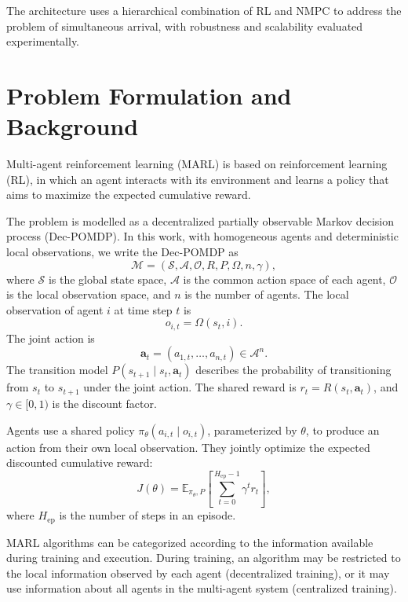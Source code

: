 \documentclass[11pt]{article}
\begin{document}
The architecture uses a hierarchical combination of RL and NMPC to address
the problem of simultaneous arrival, with robustness and scalability
evaluated experimentally.

\section{Problem Formulation and Background}
\label{sec:background}

Multi-agent reinforcement learning (MARL) is based on reinforcement learning
(RL), in which an agent interacts with its environment and learns a policy
that aims to maximize the expected cumulative reward.

The problem is modelled as a decentralized partially observable Markov
decision process (Dec-POMDP). In this work, with homogeneous agents and
deterministic local observations, we write the Dec-POMDP as
\begin{equation}
    \mathcal{M}
    = (\mathcal{S},\mathcal{A},\mathcal{O},R,P,\Omega,n,\gamma),
\end{equation}
where $\mathcal{S}$ is the global state space, $\mathcal{A}$ is the common
action space of each agent, $\mathcal{O}$ is the local observation space,
and $n$ is the number of agents. The local observation of agent $i$ at time
step $t$ is
\begin{equation}
    o_{i,t} = \Omega(s_t,i).
\end{equation}
The joint action is
\begin{equation}
    \mathbf{a}_t = (a_{1,t},\ldots,a_{n,t}) \in \mathcal{A}^{n}.
\end{equation}
The transition model $P(s_{t+1}\mid s_t,\mathbf{a}_t)$ describes the
probability of transitioning from $s_t$ to $s_{t+1}$ under the joint action.
The shared reward is $r_t=R(s_t,\mathbf{a}_t)$, and $\gamma\in[0,1)$ is
the discount factor.

Agents use a shared policy $\pi_\theta(a_{i,t}\mid o_{i,t})$, parameterized
by $\theta$, to produce an action from their own local observation. They
jointly optimize the expected discounted cumulative reward:
\begin{equation}
    J(\theta)
    = \mathbb{E}_{\pi_\theta,P}\!\left[
        \sum_{t=0}^{H_{\mathrm{ep}}-1}\gamma^t r_t
      \right],
    \label{eq:rl-objective}
\end{equation}
where $H_{\mathrm{ep}}$ is the number of steps in an episode.

MARL algorithms can be categorized according to the information available
during training and execution. During training, an algorithm may be
restricted to the local information observed by each agent
(decentralized training), or it may use information about all agents in
the multi-agent system (centralized training).
\end{document}
